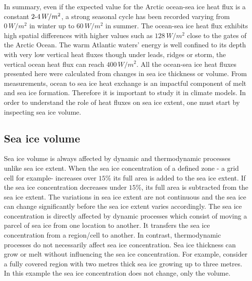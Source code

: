 In summary, even if the expected value for the Arctic ocean-sea ice heat flux is a constant $2{\text -}4 \,W/m^2$, a strong seasonal cycle has been recorded varying from $0 \,W/m^2$ in winter up to $60 \, W/m^2$ in summer. The ocean-sea ice heat flux exhibits high spatial differences with higher values such as $128 \, W/m^2$ close to the gates of the Arctic Ocean. The warm Atlantic waters' energy is well confined to its depth with very low vertical heat fluxes though under leads, ridges or storm, the vertical ocean heat flux can reach $400 \, W/m^2$. All the ocean-sea ice heat fluxes presented here were calculated from changes in sea ice thickness or volume. From measurements, ocean to sea ice heat exchange is an impactful component of melt and sea ice formation. Therefore it is important to study it in climate models. In order to understand the role of heat fluxes on sea ice extent, one must start by inspecting sea ice volume.


\subsection{Sea ice volume}\label{seaicevolume}

Sea ice volume is always affected by dynamic and thermodynamic processes unlike sea ice extent. When the sea ice concentration of a defined zone - a grid cell for example- increases over  $15\%$ its full area is added to the sea ice extent. If the sea ice concentration decreases under $15\%$, its full area is subtracted from the sea ice extent. The variations in sea ice extent are not continuous and the sea ice can change significantly before the sea ice extent varies accordingly. The sea ice concentration is directly affected by dynamic processes which consist of moving a parcel of sea ice from one location to another. It transfers the sea ice concentration from a region/cell to another. In contrast, thermodynamic processes do not necessarily affect sea ice concentration. Sea ice thickness can grow or melt without influencing the sea ice concentration. For example, consider a fully covered region with two metres thick sea ice growing up to three metres. In this example the sea ice concentration does not change, only the volume. 

